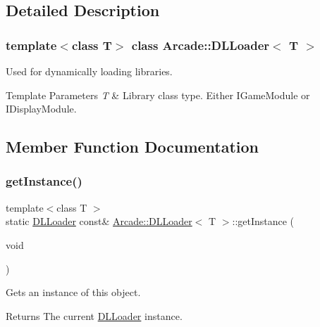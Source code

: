 \subsection{Detailed Description}
\subsubsection*{template$<$class T$>$\newline
class Arcade\+::\+D\+L\+Loader$<$ T $>$}

Used for dynamically loading libraries. 


\begin{DoxyTemplParams}{Template Parameters}
{\em T} & Library class type. Either I\+Game\+Module or I\+Display\+Module. \\
\hline
\end{DoxyTemplParams}


\subsection{Member Function Documentation}
\mbox{\label{classArcade_1_1DLLoader_a7a75048aa067e9e75aaf5faae6cfa4c1}} 
\subsubsection{\texorpdfstring{getInstance()}{getInstance()}}
{\footnotesize\ttfamily template$<$class T $>$ \\
static \mbox{\hyperlink{classArcade_1_1DLLoader}{D\+L\+Loader}} const\& \mbox{\hyperlink{classArcade_1_1DLLoader}{Arcade\+::\+D\+L\+Loader}}$<$ T $>$\+::get\+Instance (\begin{DoxyParamCaption}\item[{void}]{ }\end{DoxyParamCaption})\hspace{0.3cm}{\ttfamily [static]}}



Gets an instance of this object. 

\begin{DoxyReturn}{Returns}
The current \mbox{\hyperlink{classArcade_1_1DLLoader}{D\+L\+Loader}} instance. 
\end{DoxyReturn}
\mbox{\label{classArcade_1_1DLLoader_ab2d8182befd3ba3dc59cb0c308046de8}} 
